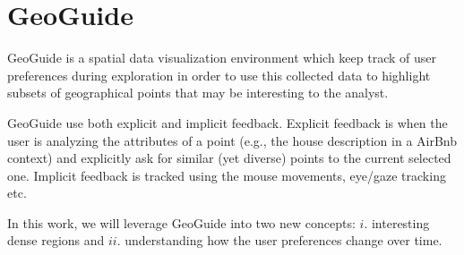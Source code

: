\section{GeoGuide}

GeoGuide \cite{omidvarTehrani2017} is a spatial data visualization environment which keep track of user preferences during exploration in order to use this collected data to highlight subsets of geographical points that may be interesting to the analyst.

GeoGuide use both explicit and implicit feedback. Explicit feedback is when the user is analyzing the attributes of a point (e.g., the house description in a AirBnb context) and explicitly ask for similar (yet diverse) points to the current selected one. Implicit feedback is tracked using the mouse movements, eye/gaze tracking etc.

In this work, we will leverage GeoGuide into two new concepts: $i$. interesting dense regions and $ii$. understanding how the user preferences change over time.